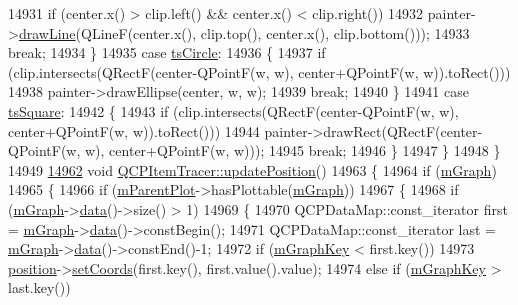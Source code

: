 \begin{DoxyCode}
14931       \textcolor{keywordflow}{if} (center.x() > clip.left() && center.x() < clip.right())
14932         painter->\hyperlink{a00047_a0b4b1b9bd495e182c731774dc800e6e0}{drawLine}(QLineF(center.x(), clip.top(), center.x(), clip.bottom()));
14933       \textcolor{keywordflow}{break};
14934     \}
14935     \textcolor{keywordflow}{case} \hyperlink{a00042_a2f05ddb13978036f902ca3ab47076500ae2252c28f4842880d71e9f94e69de94e}{tsCircle}:
14936     \{
14937       \textcolor{keywordflow}{if} (clip.intersects(QRectF(center-QPointF(w, w), center+QPointF(w, w)).toRect()))
14938         painter->drawEllipse(center, w, w);
14939       \textcolor{keywordflow}{break};
14940     \}
14941     \textcolor{keywordflow}{case} \hyperlink{a00042_a2f05ddb13978036f902ca3ab47076500a4ed5f01f2c5fd86d980366d79f481b9b}{tsSquare}:
14942     \{
14943       \textcolor{keywordflow}{if} (clip.intersects(QRectF(center-QPointF(w, w), center+QPointF(w, w)).toRect()))
14944         painter->drawRect(QRectF(center-QPointF(w, w), center+QPointF(w, w)));
14945       \textcolor{keywordflow}{break};
14946     \}
14947   \}
14948 \}
14949 
\hypertarget{a00115_source_l14962}{}\hyperlink{a00042_a5b90296109e36384aedbc8908a670413}{14962} \textcolor{keywordtype}{void} \hyperlink{a00042_a5b90296109e36384aedbc8908a670413}{QCPItemTracer::updatePosition}()
14963 \{
14964   \textcolor{keywordflow}{if} (\hyperlink{a00042_a2d70cf616b579563aa15f796dfc143ac}{mGraph})
14965   \{
14966     \textcolor{keywordflow}{if} (\hyperlink{a00044_aa2a528433e44db02b8aef23c1f9f90ed}{mParentPlot}->hasPlottable(\hyperlink{a00042_a2d70cf616b579563aa15f796dfc143ac}{mGraph}))
14967     \{
14968       \textcolor{keywordflow}{if} (\hyperlink{a00042_a2d70cf616b579563aa15f796dfc143ac}{mGraph}->\hyperlink{a00031_a8f4c17d993df4759c7426db45b33fbc0}{data}()->size() > 1)
14969       \{
14970         QCPDataMap::const\_iterator first = \hyperlink{a00042_a2d70cf616b579563aa15f796dfc143ac}{mGraph}->\hyperlink{a00031_a8f4c17d993df4759c7426db45b33fbc0}{data}()->constBegin();
14971         QCPDataMap::const\_iterator last = \hyperlink{a00042_a2d70cf616b579563aa15f796dfc143ac}{mGraph}->\hyperlink{a00031_a8f4c17d993df4759c7426db45b33fbc0}{data}()->constEnd()-1;
14972         \textcolor{keywordflow}{if} (\hyperlink{a00042_a8fa20f2e9ee07d21fd7c8d30ba4702ca}{mGraphKey} < first.key())
14973           \hyperlink{a00042_a69917e2fdb2b3a929c196958feee7cbe}{position}->\hyperlink{a00038_aa988ba4e87ab684c9021017dcaba945f}{setCoords}(first.key(), first.value().value);
14974         \textcolor{keywordflow}{else} \textcolor{keywordflow}{if} (\hyperlink{a00042_a8fa20f2e9ee07d21fd7c8d30ba4702ca}{mGraphKey} > last.key())

\end{DoxyCode}
